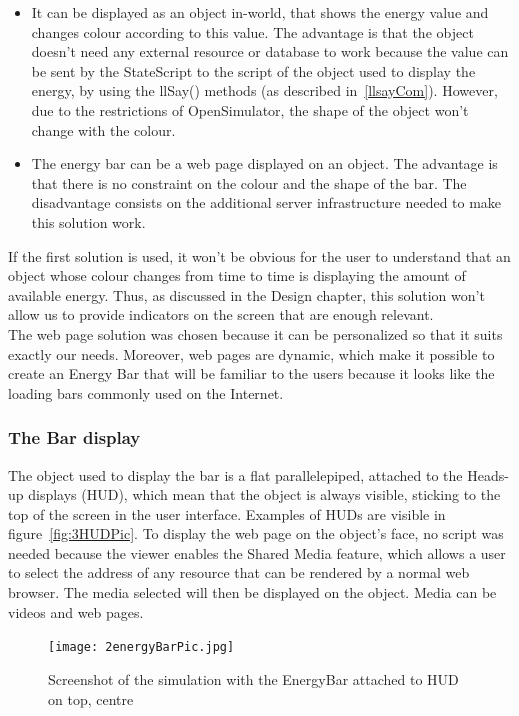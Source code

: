 \begin{itemize}
\item It can be displayed as an object in-world, that shows the energy value and changes colour according to this value. The advantage is that the object doesn't need any external resource or database to work because the value can be sent by the StateScript to the script of the object used to display the energy, by using the llSay() methods (as described in~\ref{llsayCom}). However, due to the restrictions of OpenSimulator, the shape of the object won't change with the colour. 
\item The energy bar can be a web page displayed on an object. The advantage is that there is no constraint on the colour and the shape of the bar. The disadvantage consists on the additional server infrastructure needed to make this solution work.
\end{itemize}

If the first solution is used, it won't be obvious for the user to understand that an object whose colour changes from time to time is displaying the amount of available energy. Thus, as discussed in the Design chapter, this solution won't allow us to provide indicators on the screen that are enough relevant.\\
The web page solution was chosen because it can be personalized so that it suits exactly our needs. Moreover, web pages are dynamic, which make it possible to create an Energy Bar that will be familiar to the users %
because it looks like the loading bars commonly used on the Internet.\\

\subsubsection{The Bar display} The object used to display the bar is a flat parallelepiped, attached to the Heads-up displays (HUD), which mean that the object is always visible, sticking to the top of the screen in the user interface. Examples of HUDs are visible in figure~\ref{fig:3HUDPic}. 
To display the web page on the object's face, no script was needed because the viewer enables the Shared Media\cite{sharedmediaWebsite} feature, which allows a user to select the address of any resource that can be rendered by a normal web browser. The media selected will then be displayed on the object. Media can be videos and web pages.\\

\begin{figure}[h]
  \caption{Screenshot of the simulation with the EnergyBar attached to HUD on top, centre}
  \centering
  \texttt{[image: 2energyBarPic.jpg]}
  \label{fig:2energyBarPic}
\end{figure}


